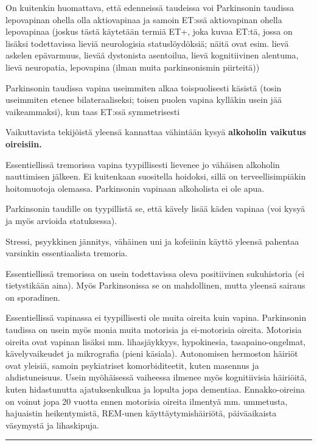 \documentclass[
]{book}
\begin{document}
On kuitenkin huomattava, että edenneissä taudeissa voi Parkinsonin taudissa lepovapinan ohella olla aktiovapinaa ja samoin ET:ssä aktiovapinan ohella lepovapinaa (joskus tästä käytetään termiä ET+, joka kuvaa ET:tä, jossa on lisäksi todettavissa lieviä neurologisia statuslöydöksiä; näitä ovat esim. lievä askelen epävarmuus, lievää dystonista asentoilua, lievä kognitiivinen alentuma, lievä neuropatia, lepovapina (ilman muita parkinsonismin piirteitä))

Parkinsonin taudissa vapina useimmiten alkaa toispuolisesti käsistä (tosin useimmiten etenee bilateraaliseksi; toisen puolen vapina kylläkin usein jää vaikeammaksi), kun taas ET:ssä symmetrisesti

Vaikuttavista tekijöistä yleensä kannattaa vähintään kysyä \textbf{alkoholin vaikutus oireisiin.}

Essentiellissä tremorissa vapina tyypillisesti lievenee jo vähäisen alkoholin nauttimisen jälkeen. Ei kuitenkaan suositella hoidoksi, sillä on terveellisimpiäkin hoitomuotoja olemassa. Parkinsonin vapinaan alkoholista ei ole apua.

Parkinsonin taudille on tyypillistä se, että kävely lisää käden vapinaa (voi kysyä ja myös arvioida statuksessa).

Stressi, psyykkinen jännitys, vähäinen uni ja kofeiinin käyttö yleensä pahentaa varsinkin essentiaalista tremoria.

Essentiellissä tremorissa on usein todettavissa oleva positiivinen sukuhistoria (ei tietystikään aina). Myös Parkinsonissa se on mahdollinen, mutta yleensä sairaus on sporadinen.

Essentiellissä vapinassa ei tyypillisesti ole muita oireita kuin vapina. Parkinsonin taudissa on usein myös monia muita motorisia ja ei-motorisia oireita. Motorisia oireita ovat vapinan lisäksi mm. lihasjäykkyys, hypokinesia, tasapaino-ongelmat, kävelyvaikeudet ja mikrografia (pieni käsiala). Autonomisen hermoston häiriöt ovat yleisiä, samoin psykiatriset komorbiditeetit, kuten masennus ja ahdistuneisuus. Usein myöhäisessä vaiheessa ilmenee myös kognitiivisia häiriöitä, kuten hidastunutta ajatuksenkulkua ja lopulta jopa dementiaa. Ennakko-oireina on voinut jopa 20 vuotta ennen motorisia oireita ilmentyä mm. ummetusta, hajuaistin heikentymistä, REM-unen käyttäytymishäiriötä, päiväaikaista väsymystä ja lihaskipuja.

\begin{center}\rule{0.5\linewidth}{0.5pt}\end{center}
\end{document}
